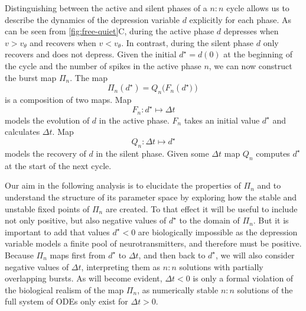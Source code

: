 \documentclass[utf8]{frontiersFPHY} %
\newcommand{\delt}{\Delta t}
\begin{document}
Distinguishing between the active and silent phases of a $n:n$ cycle allows us to describe the dynamics of the depression variable $d$ explicitly for each phase.
As can be seen from \cref{fig:free-quiet}C, during the active phase $d$ depresses when $v > v_\theta$ and recovers when $v < v_\theta$.
In contrast, during the silent phase $d$ only recovers and does not depress.
Given the initial $d^{\star} = d(0)$ at the beginning of the cycle and the number of spikes in the active phase $n$, we can now construct the burst map $\Pi_n$.
The map
\begin{equation}
	\Pi_n(d^\star)=Q_n\big(F_n(d^\star\big))
\end{equation}
\noindent
is a composition of two maps. Map
\begin{equation}
	F_n:d^\star\mapsto \Delta t
\end{equation}
models the evolution of $d$ in the active phase.
$F_n$ takes an initial value $d^{\star}$ and calculates $\Delta t$.
Map
\begin{equation}
	Q_n:\Delta t \mapsto d^{\star}
\end{equation}
models the recovery of $d$ in the silent phase.
Given some $\Delta t$ map $Q_n$ computes $d^\star$ at the start of the next cycle.

Our aim in the following analysis is to elucidate the properties of $\Pi_n$ and to understand the structure of its parameter space by exploring how the stable and unstable fixed points of $\Pi_{n}$ are created.
To that effect it will be useful to include not only positive, but also negative values of $d^{\star}$ to the domain of $\Pi_{n}$.
But it is important to add that values $d^{\star}<0$ are biologically impossible as the depression variable models a finite pool of neurotransmitters, and therefore must be positive.
Because $\Pi_{n}$ maps first from $d^{\star}$ to $\Delta t$, and then back to $d^{\star}$, we will also consider negative values of $\Delta t$, interpreting them as $n:n$ solutions with partially overlapping bursts.
As will become evident, $\delt<0$ is only a formal violation of the biological realism of the map $\Pi_{n}$, as numerically stable $n:n$ solutions of the full system of ODEs only exist for $\Delta t>0$.
\end{document}
